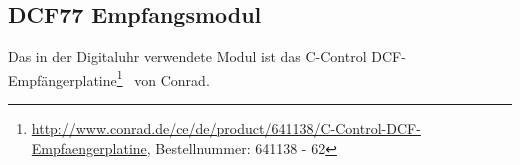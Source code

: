 \subsection{DCF77 Empfangsmodul}\label{sec_dcf77modul}
Das in der Digitaluhr verwendete Modul ist das \glqq C-Control DCF-Empfängerplatine\qrqq\footnote{\url{http://www.conrad.de/ce/de/product/641138/C-Control-DCF-Empfaengerplatine}, Bestellnummer: 641138 - 62}~ von Conrad.
%
%

